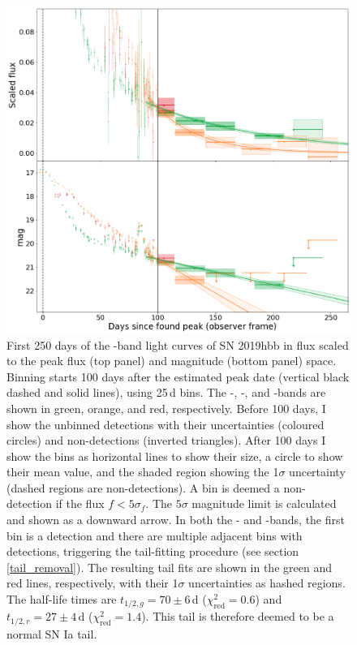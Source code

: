 \documentclass[a4paper,oneside,12pt, class=Latex/Classes/PhDthesisPSnPDF, crop=false]{standalone}
\begin{document}
\begin{figure}
 \centering
 \includegraphics[width=\textwidth]{../Images/chapter_3/bin_showcase.png}
 \caption{First 250 days of the \ztfg\ztfr\ztfi-band light curves of SN 2019hbb in flux scaled to the peak flux (top panel) and magnitude (bottom panel) space. Binning starts 100 days after the estimated peak date (vertical black dashed and solid lines), using 25\,d bins. The \ztfg-, \ztfr-, and \ztfi-bands are shown in green, orange, and red, respectively. Before 100 days, I show the unbinned detections with their uncertainties (coloured circles) and non-detections (inverted triangles). After 100 days I show the bins as horizontal lines to show their size, a circle to show their mean value, and the shaded region showing the 1$\sigma$ uncertainty (dashed regions are non-detections). A bin is deemed a non-detection if the flux $f<5\sigma_f$. The $5\sigma$ magnitude limit is calculated and shown as a downward arrow. In both the \ztfg- and \ztfr-bands, the first bin is a detection and there are multiple adjacent bins with detections, triggering the tail-fitting procedure (see section \ref{tail_removal}). The resulting tail fits are shown in the green and red lines, respectively, with their 1$\sigma$ uncertainties as hashed regions. The half-life times are $t_{1/2,g} = 70 \pm 6$\,d ($\chi^2_\text{red} = 0.6$) and $t_{1/2,r} = 27 \pm 4$\,d ($\chi^2_\text{red} = 1.4$). This tail is therefore deemed to be a normal SN Ia tail.}
 \label{bin_showcase}
\end{figure}
\end{document}
